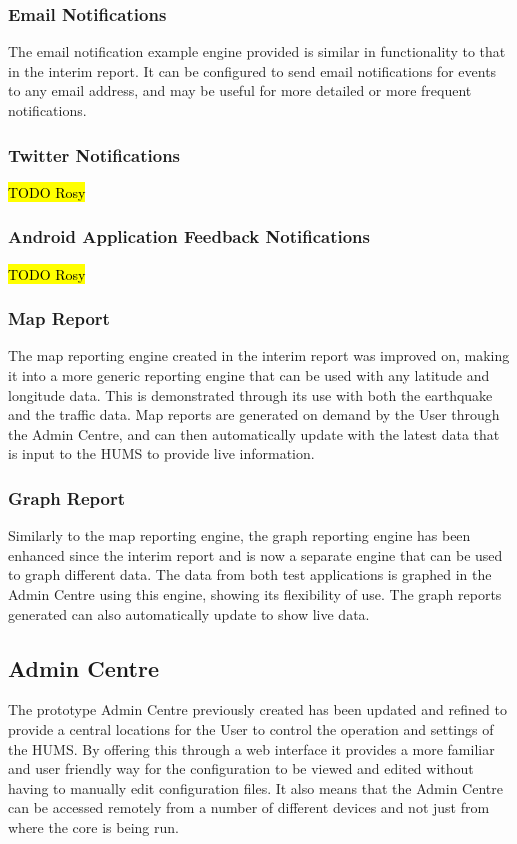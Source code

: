 \documentclass[10pt,a4paper]{article}
\begin{document}
\subsubsection{Email Notifications}
The email notification example engine provided is similar in functionality to that in the interim report. It can be configured to send email notifications for events to any email address, and may be useful for more detailed or more frequent notifications.

\subsubsection{Twitter Notifications}
\hl{TODO Rosy}

\subsubsection{Android Application Feedback Notifications}
\hl{TODO Rosy}

\subsubsection{Map Report}
The map reporting engine created in the interim report was improved on, making it into a more generic reporting engine that can be used with any latitude and longitude data. This is demonstrated through its use with both the earthquake and the traffic data. Map reports are generated on demand by the User through the Admin Centre, and can then automatically update with the latest data that is input to the HUMS to provide live information.

\subsubsection{Graph Report}
Similarly to the map reporting engine, the graph reporting engine has been enhanced since the interim report and is now a separate engine that can be used to graph different data. The data from both test applications is graphed in the Admin Centre using this engine, showing its flexibility of use. The graph reports generated can also automatically update to show live data.

\subsection{Admin Centre}
\label{sec:admin}

The prototype Admin Centre previously created has been updated and refined to provide a central locations for the User to control the operation and settings of the HUMS. By offering this through a web interface it provides a more familiar and user friendly way for the configuration to be viewed and edited without having to manually edit configuration files. It also means that the Admin Centre can be accessed remotely from a number of different devices and not just from where the core is being run.
\end{document}
